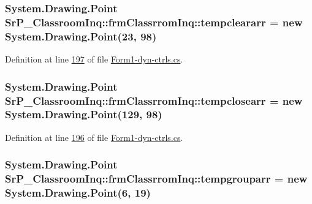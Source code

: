 \hypertarget{class_sr_p___classroom_inq_1_1frm_classrrom_inq_a189c01a3745fca62a8250be6a3517894}{
\subsubsection[{tempcleararr}]{\setlength{\rightskip}{0pt plus 5cm}\-System.\-Drawing.\-Point {\bf \-Sr\-P\-\_\-\-Classroom\-Inq\-::frm\-Classrrom\-Inq\-::tempcleararr} = new \-System.\-Drawing.\-Point(23, 98)}}
\label{class_sr_p___classroom_inq_1_1frm_classrrom_inq_a189c01a3745fca62a8250be6a3517894}


\-Definition at line \hyperlink{_form1-dyn-ctrls_8cs_source_l00197}{197} of file \hyperlink{_form1-dyn-ctrls_8cs_source}{\-Form1-\/dyn-\/ctrls.\-cs}.

\hypertarget{class_sr_p___classroom_inq_1_1frm_classrrom_inq_a6ad2bdb537cfc35b174dd16dd8e03904}{
\subsubsection[{tempclosearr}]{\setlength{\rightskip}{0pt plus 5cm}\-System.\-Drawing.\-Point {\bf \-Sr\-P\-\_\-\-Classroom\-Inq\-::frm\-Classrrom\-Inq\-::tempclosearr} = new \-System.\-Drawing.\-Point(129, 98)}}
\label{class_sr_p___classroom_inq_1_1frm_classrrom_inq_a6ad2bdb537cfc35b174dd16dd8e03904}


\-Definition at line \hyperlink{_form1-dyn-ctrls_8cs_source_l00196}{196} of file \hyperlink{_form1-dyn-ctrls_8cs_source}{\-Form1-\/dyn-\/ctrls.\-cs}.

\hypertarget{class_sr_p___classroom_inq_1_1frm_classrrom_inq_a6c8231644b9d1f92d08f110b003d621e}{
\subsubsection[{tempgrouparr}]{\setlength{\rightskip}{0pt plus 5cm}\-System.\-Drawing.\-Point {\bf \-Sr\-P\-\_\-\-Classroom\-Inq\-::frm\-Classrrom\-Inq\-::tempgrouparr} = new \-System.\-Drawing.\-Point(6, 19)}}
\label{class_sr_p___classroom_inq_1_1frm_classrrom_inq_a6c8231644b9d1f92d08f110b003d621e}


